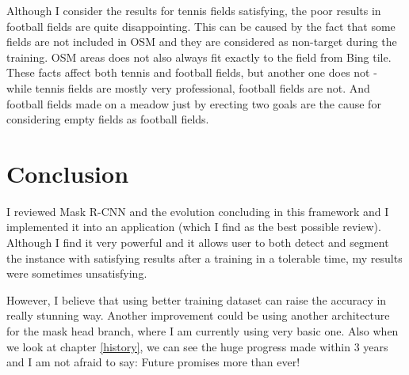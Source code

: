 \documentclass[journal, onecolumn, a4paper]{IEEEtran}
\begin{document}
Although I consider the results for tennis fields satisfying, the poor results in football fields are quite disappointing. This can be caused by the fact that some fields are not included in OSM and they are considered as non-target during the training. OSM areas does not also always fit exactly to the field from Bing tile. These facts affect both tennis and football fields, but another one does not - while tennis fields are mostly very professional, football fields are not. And football fields made on a meadow just by erecting two goals are the cause for considering empty fields as football fields. 

\section*{Conclusion}

I reviewed Mask R-CNN and the evolution concluding in this framework and I implemented it into an application (which I find as the best possible review). Although I find it very powerful and it allows user to both detect and segment the instance with satisfying results after a training in a tolerable time, my results were sometimes unsatisfying. 

However, I believe that using better training dataset can raise the accuracy in really stunning way. Another improvement could be using another architecture for the mask head branch, where I am currently using very basic one. Also when we look at chapter \ref{history}, we can see the huge progress made within 3 years and I am not afraid to say: Future promises more than ever! 



\end{document}
